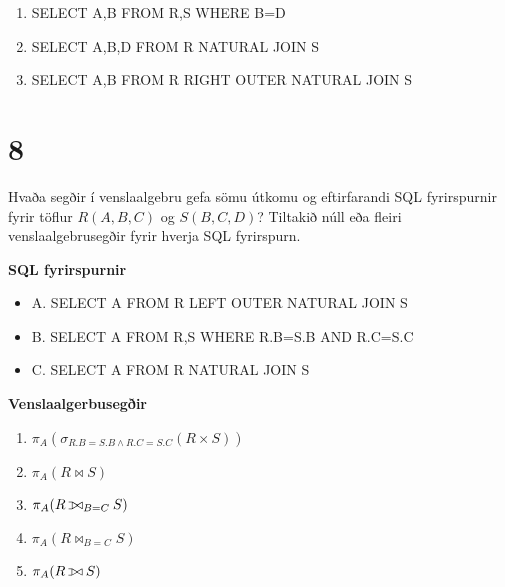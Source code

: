 \documentclass{article}
\def\ojoin{\setbox0=\hbox{$\bowtie$}%
  \rule[-.02ex]{.25em}{.4pt}\llap{\rule[\ht0]{.25em}{.4pt}}}
\def\leftouterjoin{\mathbin{\ojoin\mkern-5.8mu\bowtie}}
\newcommand{\bo}[1]{\textbf{#1}}
\newcommand{\enum}{\begin{enumerate}[label = \alph*.]}
\begin{document}
\enum
\item SELECT A,B FROM R,S WHERE B=D
\item SELECT A,B,D FROM R NATURAL JOIN S
\item SELECT A,B FROM R RIGHT OUTER NATURAL JOIN S
\end{enumerate}

\vspace{1cm}

\section{8}
Hvaða segðir í venslaalgebru gefa sömu útkomu og eftirfarandi
SQL fyrirspurnir fyrir töflur $R(A, B, C)$ og $S(B, C, D)$? Tiltakið núll eða
fleiri venslaalgebrusegðir fyrir hverja SQL fyrirspurn.

\bo{SQL fyrirspurnir}
\begin{itemize}
    \item A. SELECT A FROM R LEFT OUTER NATURAL JOIN S
    \item B. SELECT A FROM R,S WHERE R.B=S.B AND R.C=S.C
    \item C. SELECT A FROM R NATURAL JOIN S
\end{itemize}
\bo{Venslaalgerbusegðir}
\enum
\item $\pi_A(\sigma_{R.B=S.B\wedge R.C=S.C}(R\times S))$
\item $\pi_A(R \bowtie S)$
\item $\pi_A(R \leftouterjoin_{B=C}S)$
\item $\pi_A(R \bowtie_{B=C}S)$
\item $\pi_A(R \leftouterjoin S)$
\end{enumerate}
\end{document}
